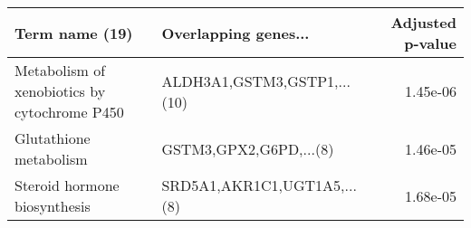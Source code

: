 \begin{tabular}{llr}
\toprule
                              Term name (19) &        Overlapping genes... &  Adjusted p-value \\
\midrule
Metabolism of xenobiotics by cytochrome P450 & ALDH3A1,GSTM3,GSTP1,...(10) &          1.45e-06 \\
                      Glutathione metabolism &      GSTM3,GPX2,G6PD,...(8) &          1.46e-05 \\
                Steroid hormone biosynthesis & SRD5A1,AKR1C1,UGT1A5,...(8) &          1.68e-05 \\
\bottomrule
\end{tabular}

